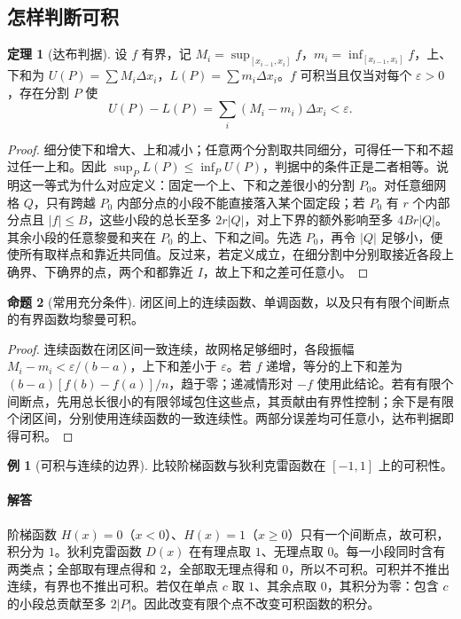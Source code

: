 \documentclass[UTF8,fontset=fandol,12pt,oneside,openany]{ctexrep}
\theoremstyle{definition}
\newtheorem{theorem}{定理}[chapter]
\newtheorem{proposition}[theorem]{命题}
\newtheorem{example}{例}[chapter]
\begin{document}
\subsection{怎样判断可积}
\begin{theorem}[达布判据]
设 $f$ 有界，记 $M_i=\sup_{[x_{i-1},x_i]}f$，$m_i=\inf_{[x_{i-1},x_i]}f$，上、下和为 $U(P)=\sum M_i\Delta x_i$，$L(P)=\sum m_i\Delta x_i$。$f$ 可积当且仅当对每个 $\varepsilon>0$，存在分割 $P$ 使
\[U(P)-L(P)=\sum_i(M_i-m_i)\Delta x_i<\varepsilon.\]
\end{theorem}
\begin{proof}
细分使下和增大、上和减小；任意两个分割取共同细分，可得任一下和不超过任一上和。因此 $\sup_P L(P)\le\inf_P U(P)$，判据中的条件正是二者相等。说明这一等式为什么对应定义：固定一个上、下和之差很小的分割 $P_0$。对任意细网格 $Q$，只有跨越 $P_0$ 内部分点的小段不能直接落入某个固定段；若 $P_0$ 有 $r$ 个内部分点且 $|f|\le B$，这些小段的总长至多 $2r|Q|$，对上下界的额外影响至多 $4Br|Q|$。其余小段的任意黎曼和夹在 $P_0$ 的上、下和之间。先选 $P_0$，再令 $|Q|$ 足够小，便使所有取样点和靠近共同值。反过来，若定义成立，在细分割中分别取接近各段上确界、下确界的点，两个和都靠近 $I$，故上下和之差可任意小。
\end{proof}
\begin{proposition}[常用充分条件]
闭区间上的连续函数、单调函数，以及只有有限个间断点的有界函数均黎曼可积。
\end{proposition}
\begin{proof}
连续函数在闭区间一致连续，故网格足够细时，各段振幅 $M_i-m_i<\varepsilon/(b-a)$，上下和差小于 $\varepsilon$。若 $f$ 递增，等分的上下和差为 $(b-a)[f(b)-f(a)]/n$，趋于零；递减情形对 $-f$ 使用此结论。若有有限个间断点，先用总长很小的有限邻域包住这些点，其贡献由有界性控制；余下是有限个闭区间，分别使用连续函数的一致连续性。两部分误差均可任意小，达布判据即得可积。
\end{proof}
\begin{example}[可积与连续的边界]
比较阶梯函数与狄利克雷函数在 $[-1,1]$ 上的可积性。
\end{example}
\paragraph{解答} 阶梯函数 $H(x)=0$（$x<0$）、$H(x)=1$（$x\ge0$）只有一个间断点，故可积，积分为 $1$。狄利克雷函数 $D(x)$ 在有理点取 $1$、无理点取 $0$。每一小段同时含有两类点；全部取有理点得和 $2$，全部取无理点得和 $0$，所以不可积。可积并不推出连续，有界也不推出可积。若仅在单点 $c$ 取 $1$、其余点取 $0$，其积分为零：包含 $c$ 的小段总贡献至多 $2|P|$。因此改变有限个点不改变可积函数的积分。
\end{document}
